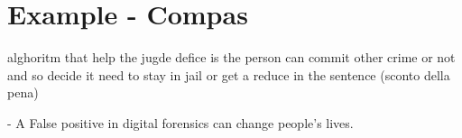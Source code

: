 \section{Example - Compas}
alghoritm that help the jugde defice is the person can commit other crime or not 
and so decide it need to stay in jail or get a reduce in the sentence (sconto della pena)

- A False positive in digital forensics can change people's lives.



